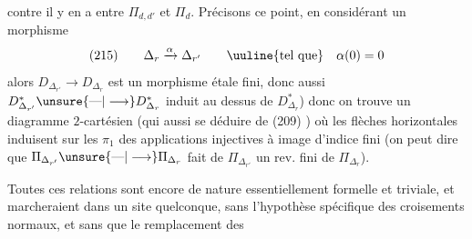 contre il y en a entre $\Pi_{d,d'}$ et $\Pi_d$.
Précisons ce point, en considérant un
morphisme
\[
(215)\qquad\Delta_r\xrightarrow{\alpha}\Delta_{r'}\qquad\text{\uuline{tel que}}\quad\alpha(0)=0
\]
alors $D_{\Delta_{r'}}\longrightarrow D_{\Delta_r}$ est un morphisme
étale fini, donc aussi $D^*_{\Delta_{r'}}\unsure{\text{---}|\longrightarrow}D^*_{\Delta_r}$ induit
au dessus de $D^*_{\Delta_r}$) donc on trouve
un diagramme $2$-cartésien (qui  
 aussi se déduire de (209)
)
où les flèches horizontales induisent sur
les $\pi_1$ des applications injectives à
image d'indice fini (on peut dire que
$\Pi_{\Delta_{r'}}\unsure{\text{---}|\longrightarrow}\Pi_{\Delta_r}$ fait de $\Pi_{\Delta_{r'}}$ un
rev. fini de $\Pi_{\Delta_r}$).

Toutes ces relations sont encore de
nature essentiellement formelle et triviale,
et marcheraient dans un site quelconque,
sans l'hypothèse spécifique des croisements
normaux, et sans que le remplacement des
